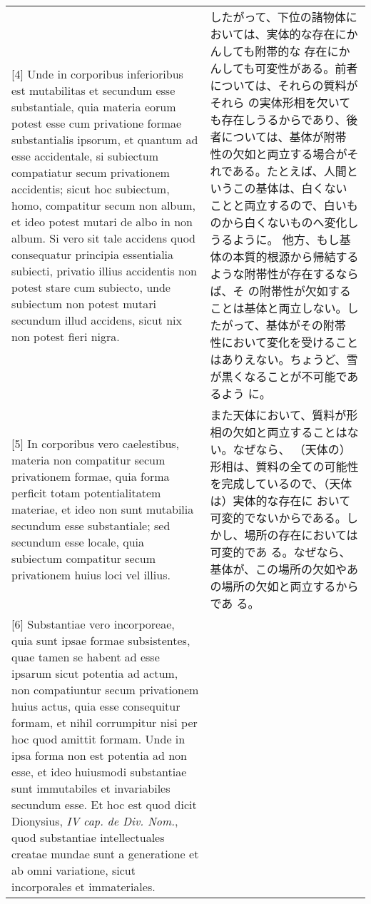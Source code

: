 \documentclass[10pt]{jsarticle} %
\begin{document}
\begin{longtable}{p{21em}p{21em}}
\\

[4] Unde in corporibus inferioribus est mutabilitas et secundum esse
substantiale, quia materia eorum potest esse cum privatione formae
substantialis ipsorum, et quantum ad esse accidentale, si subiectum
compatiatur secum privationem accidentis; sicut hoc subiectum, homo,
compatitur secum non album, et ideo potest mutari de albo in non
album.
Si vero sit tale accidens quod consequatur principia essentialia
subiecti, privatio illius accidentis non potest stare cum subiecto,
unde subiectum non potest mutari secundum illud accidens, sicut nix
non potest fieri nigra.

&

したがって、下位の諸物体においては、実体的な存在にかんしても附帯的な
存在にかんしても可変性がある。前者については、それらの質料がそれら
の実体形相を欠いても存在しうるからであり、後者については、基体が附帯
性の欠如と両立する場合がそれである。たとえば、人間というこの基体は、白くない
ことと両立するので、白いものから白くないものへ変化しうるように。
他方、もし基体の本質的根源から帰結するような附帯性が存在するならば、そ
 の附帯性が欠如することは基体と両立しない。したがって、基体がその附帯
 性において変化を受けることはありえない。ちょうど、雪が黒くなることが不可能であるよう
に。


\\

[5] In corporibus vero caelestibus, materia non compatitur secum
privationem formae, quia forma perficit totam potentialitatem
materiae, et ideo non sunt mutabilia secundum esse substantiale; sed
secundum esse locale, quia subiectum compatitur secum privationem
huius loci vel illius.

&


また天体において、質料が形相の欠如と両立することはない。なぜなら、
（天体の）形相は、質料の全ての可能性を完成しているので、（天体は）実体的な存在に
 おいて可変的でないからである。しかし、場所の存在においては可変的であ
る。なぜなら、基体が、この場所の欠如やあの場所の欠如と両立するからであ
る。

\\

[6] Substantiae vero incorporeae, quia sunt ipsae formae subsistentes,
quae tamen se habent ad esse ipsarum sicut potentia ad actum, non
compatiuntur secum privationem huius actus, quia esse consequitur
formam, et nihil corrumpitur nisi per hoc quod amittit formam. Unde in
ipsa forma non est potentia ad non esse, et ideo huiusmodi substantiae
sunt immutabiles et invariabiles secundum esse. Et hoc est quod dicit
Dionysius, {\it IV cap. de Div. Nom.}, quod substantiae intellectuales
creatae mundae sunt a generatione et ab omni variatione, sicut
incorporales et immateriales.


\end{longtable}
\end{document}

